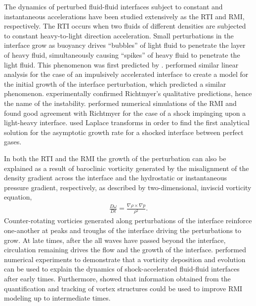 The dynamics of perturbed fluid-fluid interfaces subject to constant
and instantaneous accelerations have been studied extensively as the
\ac{RTI} and \ac{RMI}, respectively. The \ac{RTI} occurs when two
fluids of different densities are subjected to constant heavy-to-light
direction acceleration. Small perturbations in the interface grow as
buoyancy drives ``bubbles'' of light fluid to penetrate the layer of
heavy fluid, simultaneously causing ``spikes'' of heavy fluid to
penetrate the light fluid. This phenomenon was first predicted by
\cite{Taylor1950}. \cite{Richtmyer1960} performed similar linear
analysis for the case of an impulsively accelerated interface to
create a model for the initial growth of the interface perturbation,
which predicted a similar phenomenon. \cite{Meshkov1969}
experimentally confirmed Richtmyer's qualitative predictions, hence
the name of the instability. \cite{Meyer1972} performed numerical
simulations of the \ac{RMI} and found good agreement with Richtmyer
for the case of a shock impinging upon a light-heavy
interface. \cite{Fraley1986} used Laplace transforms in order to find
the first analytical solution for the asymptotic growth rate for a
shocked interface between perfect gases. 

In both the \ac{RTI} and the \ac{RMI} the growth of the perturbation
can also be explained as a result of baroclinic vorticity generated by
the misalignment of the density gradient across the interface and the
hydrostatic or instantaneous pressure gradient, respectively, as
described by two-dimensional, inviscid vorticity equation,
\begin{align}
  \label{eq:baroclinic_equation}
  \frac{D\omega}{Dt} = \frac{\nabla \rho \times \nabla p}{\rho^2}.%
\end{align}
Counter-rotating vorticies generated along perturbations of the
interface reinforce one-another at peaks and troughs of the interface
driving the perturbations to grow. At late times, after the all waves
have passed beyond the interface, circulation remaining drives the
flow and the growth of the interface. \cite{Hawley1989} performed
numerical experiments to demonstrate that a vorticity deposition and
evolution can be used to explain the dynamics of shock-accelerated
fluid-fluid interfaces after early times. Furthermore,
\cite{Zabusky1999} showed that information obtained from the
quantification and tracking of vortex structures could be used to
improve \ac{RMI} modeling up to intermediate times.

